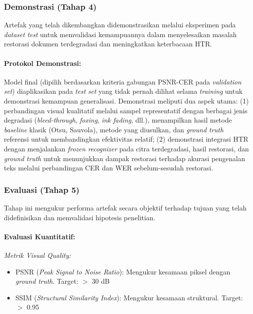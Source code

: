 \documentclass[12pt,a4paper]{book}
\begin{document}
\subsubsection{Demonstrasi (Tahap 4)}
Artefak yang telah dikembangkan didemonstrasikan melalui eksperimen pada \textit{dataset test} untuk memvalidasi kemampuannya dalam menyelesaikan masalah restorasi dokumen terdegradasi dan meningkatkan keterbacaan HTR.

\paragraph{Protokol Demonstrasi:}
Model final (dipilih berdasarkan kriteria gabungan PSNR-CER pada \textit{validation set}) diaplikasikan pada \textit{test set} yang tidak pernah dilihat selama \textit{training} untuk demonstrasi kemampuan generalisasi. Demonstrasi meliputi dua aspek utama: (1) perbandingan visual kualitatif melalui sampel representatif dengan berbagai jenis degradasi (\textit{bleed-through}, \textit{foxing}, \textit{ink fading}, dll.), menampilkan hasil metode \textit{baseline} klasik (Otsu, Sauvola), metode yang diusulkan, dan \textit{ground truth} referensi untuk membandingkan efektivitas relatif; (2) demonstrasi integrasi HTR dengan menjalankan \textit{frozen recognizer} pada citra terdegradasi, hasil restorasi, dan \textit{ground truth} untuk menunjukkan dampak restorasi terhadap akurasi pengenalan teks melalui perbandingan CER dan WER sebelum-sesudah restorasi.

\subsubsection{Evaluasi (Tahap 5)}
Tahap ini mengukur performa artefak secara objektif terhadap tujuan yang telah didefinisikan dan memvalidasi hipotesis penelitian.

\paragraph{Evaluasi Kuantitatif:}

\textit{Metrik Visual Quality:}
\begin{itemize}[leftmargin=*, nosep]
\item PSNR (\textit{Peak Signal to Noise Ratio}): Mengukur kesamaan piksel dengan \textit{ground truth}. Target: $>$ 30 dB
\item SSIM (\textit{Structural Similarity Index}): Mengukur kesamaan struktural. Target: $>$ 0.95
\end{itemize}
\end{document}
